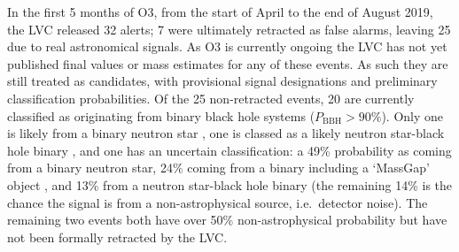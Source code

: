 \begin{colsection}
In the first 5 months of O3, from the start of April to the end of August 2019, the LVC released 32 alerts; 7 were ultimately retracted as false alarms, leaving 25 due to real astronomical signals. As O3 is currently ongoing the LVC has not yet published final values or mass estimates for any of these events. As such they are still treated as candidates, with provisional signal designations and preliminary classification probabilities. Of the 25 non-retracted events, 20 are currently classified as originating from binary black hole systems ($P_\text{BBH}>90\%$). Only one is likely from a binary neutron star \citep[S190425z;][]{S190425z}, one is classed as a likely neutron star-black hole binary \citep[S190814bv;][]{S190814bv}, and one \citep[S190426c;][]{S190426c} has an uncertain classification: a 49\% probability as coming from a binary neutron star, 24\% coming from a binary including a `MassGap' object \citep[a theorised object with a mass between a neutron star and a black hole;][]{GW_MassGap}, and 13\% from a neutron star-black hole binary (the remaining 14\% is the chance the signal is from a non-astrophysical source, i.e.\ detector noise). The remaining two events both have over 50\% non-astrophysical probability but have not been formally retracted by the LVC.\@

\end{colsection}



